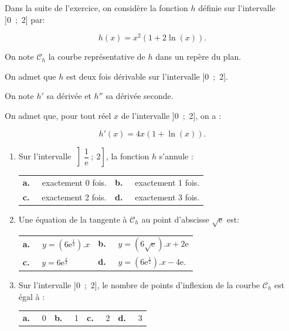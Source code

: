 \documentclass[10pt]{article}
\begin{document}
Dans la suite de l'exercice, on considère la fonction $h$ définie sur l'intervalle ]0~;~2] par:

\[h(x) = x^2(1 + 2\ln (x)).\]

On note $\mathcal{C}_h$ la courbe représentative de $h$ dans un repère du plan. 

On admet que $h$ est deux fois dérivable sur l'intervalle ]0~;~2].

On note $h'$ sa dérivée et $h''$ sa dérivée seconde.

On admet que, pour tout réel $x$ de l'intervalle ]0~;~2], on a : 

\[h'(x) = 4x(1 + \ln (x)).\]

\begin{enumerate}[resume]
\item Sur l'intervalle $\left]\dfrac{1}{\text{e}}~;~2\right]$, la fonction $h$ s'annule :

\begin{center}
\begin{tabularx}{\linewidth}{*{2}{X}}
\textbf{a.~~} exactement 0 fois. &\textbf{b.~~}  exactement 1 fois.\\
\textbf{c.~~} exactement 2 fois. &\textbf{d.~~}  exactement 3 fois.
\end{tabularx}
\end{center}

\item Une équation de la tangente à $\mathcal{C}_h$ au point d'abscisse $\sqrt{\text{e}}$ est:

\begin{center}
\begin{tabularx}{\linewidth}{*{2}{X}}
\textbf{a.~~} $y = \left(6\text{e}^{\frac12}\right) .{} x $&
\textbf{b.~~} $y = \left(6\sqrt{\text{e}}\right).{} x + 2\text{e}$\\
\textbf{c.~~} $y = 6\text{e}^{\frac{x}{2}}$&\textbf{d.~~} $y = \left(6\text{e}^{\frac12}\right) .{} x - 4\text{e}$.
\end{tabularx}
\end{center}

\item Sur l'intervalle ]0~;~2], le nombre de points d'inflexion de la courbe $\mathcal{C}_h$ est égal à :

\begin{center}
\begin{tabularx}{\linewidth}{*{4}{X}}
\textbf{a.~~} 0&\textbf{b.~~} 1 &\textbf{c.~~} 2 &\textbf{d.~~}  3
\end{tabularx}
\end{center}


\end{enumerate}
\end{document}
